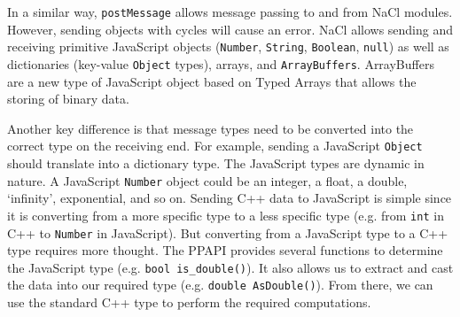 In a similar way, \lstinline+postMessage+ allows message passing to and from NaCl modules. However, sending objects with cycles will cause an error. NaCl allows sending and receiving primitive JavaScript objects (\lstinline+Number+, \lstinline+String+, \lstinline+Boolean+, \lstinline+null+) as well as dictionaries (key-value \lstinline+Object+ types), arrays, and \lstinline+ArrayBuffers+. ArrayBuffers are a new type of JavaScript object based on Typed Arrays \cite{typedarraysw3c} that allows the storing of binary data. 

Another key difference is that message types need to be converted into the correct type on the receiving end. For example, sending a JavaScript \lstinline+Object+ should translate into a dictionary type. The JavaScript types are dynamic in nature. A JavaScript \lstinline+Number+ object could be an integer, a float, a double, `infinity', exponential, and so on. Sending C++ data to JavaScript is simple since it is converting from a more specific type to a less specific type (e.g. from \lstinline+int+ in C++ to \lstinline+Number+ in JavaScript). But converting from a JavaScript type to a C++ type requires more thought. The PPAPI provides several functions to determine the JavaScript type (e.g. \lstinline+bool is_double()+). It also allows us to extract and cast the data into our required type (e.g. \lstinline+double AsDouble()+). From there, we can use the standard C++ type to perform the required computations.


